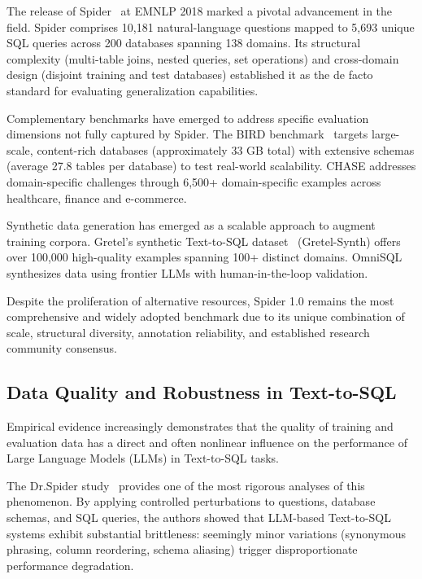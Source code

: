 \documentclass[]{einformatica}
\begin{document}
The release of Spider~\cite{yu2018spider} at EMNLP 2018 marked a pivotal advancement in the field. Spider comprises 10,181 natural-language questions mapped to 5,693 unique SQL queries across 200 databases spanning 138 domains. Its structural complexity (multi-table joins, nested queries, set operations) and cross-domain design (disjoint training and test databases) established it as the de facto standard for evaluating generalization capabilities.

Complementary benchmarks have emerged to address specific evaluation dimensions not fully captured by Spider. The BIRD benchmark~\cite{bird_benchmark} targets large-scale, content-rich databases (approximately 33 GB total) with extensive schemas (average 27.8 tables per database) to test real-world scalability. CHASE addresses domain-specific challenges through 6,500+ domain-specific examples across healthcare, finance and e-commerce.

Synthetic data generation has emerged as a scalable approach to augment training corpora. Gretel's synthetic Text-to-SQL dataset~\cite{gretel_synth} (Gretel-Synth) offers over 100,000 high-quality examples spanning 100+ distinct domains. OmniSQL~\cite{omnisql} synthesizes data using frontier LLMs with human-in-the-loop validation.

Despite the proliferation of alternative resources, Spider 1.0 remains the most comprehensive and widely adopted benchmark due to its unique combination of scale, structural diversity, annotation reliability, and established research community consensus.

\subsection{Data Quality and Robustness in Text-to-SQL}

Empirical evidence increasingly demonstrates that the quality of training and evaluation data has a direct and often nonlinear influence on the performance of Large Language Models (LLMs) in Text-to-SQL tasks.

The Dr.Spider study~\cite{drspider} provides one of the most rigorous analyses of this phenomenon. By applying controlled perturbations to questions, database schemas, and SQL queries, the authors showed that LLM-based Text-to-SQL systems exhibit substantial brittleness: seemingly minor variations (synonymous phrasing, column reordering, schema aliasing) trigger disproportionate performance degradation.
\end{document}
